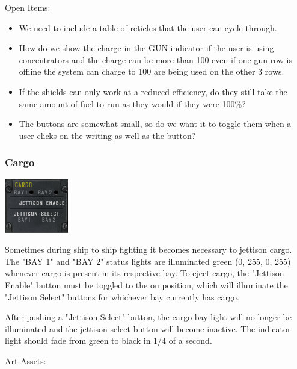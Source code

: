 Open Items:
\begin{itemize}
\item We need to include a table of reticles that the user can cycle through.
\item How do we show the charge in the GUN indicator if the user is
using concentrators and the charge can be more than 100%
even if one gun row is offline the system can charge to 100%
are being used on the other 3 rows.
\item If the shields can only work at a reduced efficiency, do they still
take the same amount of fuel to run as they would if they were 100\%?
\item The buttons are somewhat small, so do we want it to toggle them
when a user clicks on the writing as well as the button?
\end{itemize}

\subsubsection{Cargo}

\includegraphics[scale=0.7]{images/cargo.png}

Sometimes during ship to ship fighting it becomes necessary to jettison cargo.
The "BAY 1" and "BAY 2" status lights are illuminated green (0, 255, 0, 255)
whenever cargo is present in its respective bay.  To eject cargo, the
"Jettison Enable" button must be toggled to the on position, which will
illuminate the "Jettison Select" buttons for whichever bay currently
has cargo.

After pushing a "Jettison Select" button, the cargo bay light will no longer
be illuminated and the jettison select button will become inactive.  The
indicator light should fade from green to black in 1\slash 4 of a second.

Art Assets:

